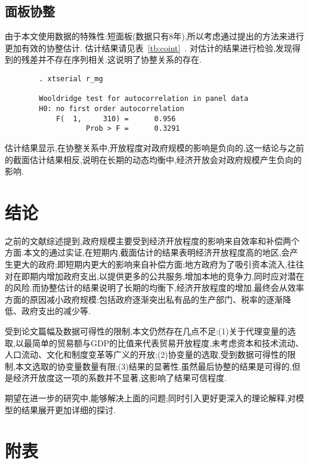 \documentclass[10pt]{article}
\begin{document}
\subsection{面板协整}
由于本文使用数据的特殊性:短面板(数据只有8年),所以考虑通过\cite{pesaran2006estimation}提出的方法来进行更加有效的协整估计. 估计结果请见表~\ref{tb:coint}~.
对估计的结果进行检验,发现得到的残差并不存在序列相关.这说明了协整关系的存在.

    \begin{framed}
    \begin{verbatim}
        . xtserial r_mg

        Wooldridge test for autocorrelation in panel data
        H0: no first order autocorrelation
            F(  1,     310) =      0.956
                   Prob > F =      0.3291
    \end{verbatim}
    \end{framed}

估计结果显示,在协整关系中,开放程度对政府规模的影响是负向的,这一结论与之前的截面估计结果相反,说明在长期的动态均衡中,经济开放会对政府规模产生负向的影响.


\section{结论}
之前的文献综述提到,政府规模主要受到经济开放程度的影响来自效率和补偿两个方面.本文的通过实证,在短期内,截面估计的结果表明经济开放程度高的地区,会产生更大的政府;即短期内更大的影响来自补偿方面:地方政府为了吸引资本流入,往往对在即期内增加政府支出,以提供更多的公共服务,增加本地的竞争力,同时应对潜在的风险.而协整估计的结果说明了长期的均衡下,经济开放程度的增加,最终会从效率方面的原因减小政府规模:包括政府逐渐突出私有品的生产部门、税率的逐渐降低、政府支出的减少等.

受到论文篇幅及数据可得性的限制,本文仍然存在几点不足:(1)关于代理变量的选取,以最简单的贸易额与GDP的比值来代表贸易开放程度,未考虑资本和技术流动、人口流动、文化和制度变革等广义的开放;(2)协变量的选取,受到数据可得性的限制,本文选取的协变量数量有限;(3)结果的显著性.虽然最后协整的结果是可得的,但是经济开放度这一项的系数并不显著,这影响了结果可信程度.

期望在进一步的研究中,能够解决上面的问题;同时引入更好更深入的理论解释,对模型的结果展开更加详细的探讨.

\clearpage
\renewcommand\refname{参考文献}
%	


\clearpage
\appendix
\section{附表}
\end{document}
